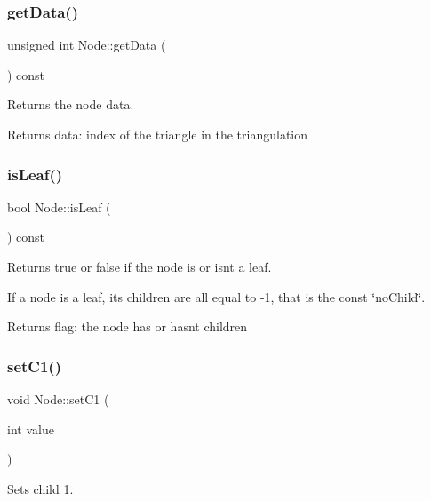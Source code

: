 \subsubsection{\texorpdfstring{get\+Data()}{getData()}}
{\footnotesize\ttfamily unsigned int Node\+::get\+Data (\begin{DoxyParamCaption}{ }\end{DoxyParamCaption}) const}



Returns the node data. 

\begin{DoxyReturn}{Returns}
data\+: index of the triangle in the triangulation 
\end{DoxyReturn}
\mbox{\label{classNode_a0c5b662d3bfbb856292a9aab878ed622}} 
\subsubsection{\texorpdfstring{is\+Leaf()}{isLeaf()}}
{\footnotesize\ttfamily bool Node\+::is\+Leaf (\begin{DoxyParamCaption}{ }\end{DoxyParamCaption}) const}



Returns true or false if the node is or isn\textquotesingle{}t a leaf. 

If a node is a leaf, its children are all equal to -\/1, that is the const \char`\"{}no\+Child\char`\"{}.

\begin{DoxyReturn}{Returns}
flag\+: the node has or hasn\textquotesingle{}t children 
\end{DoxyReturn}
\mbox{\label{classNode_ad6d91049f0851255bb064836405067be}} 
\subsubsection{\texorpdfstring{set\+C1()}{setC1()}}
{\footnotesize\ttfamily void Node\+::set\+C1 (\begin{DoxyParamCaption}\item[{int}]{value }\end{DoxyParamCaption})}



Sets child 1. 



